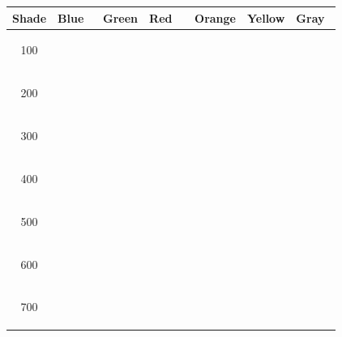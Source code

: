 \FloatBarrier
\begin{table}[ht]
\centering
\begingroup
\setlength{\tabcolsep}{10pt}
\renewcommand{\arraystretch}{1.5}
\begin{tabular}{|c|p{1.5cm}<{\centering}|p{1.5cm}<{\centering}|p{1.5cm}<{\centering}|p{1.5cm}<{\centering}|p{1.5cm}<{\centering}|p{1.5cm}<{\centering}|}
\hline
\textbf{Shade} & \textbf{Blue} & \textbf{Green} & \textbf{Red} & \textbf{Orange} & \textbf{Yellow} & \textbf{Gray} \\ \hline
100 & \colorbox{blue100}{\strut \ \ \ \ \ \ } & \colorbox{green100}{\strut \ \ \ \ \ \ } & \colorbox{red100}{\strut \ \ \ \ \ \ } & \colorbox{orange100}{\strut \ \ \ \ \ \ } & \colorbox{yellow100}{\strut \ \ \ \ \ \ } & \colorbox{gray100}{\strut \ \ \ \ \ \ } \\
200 & \colorbox{blue200}{\strut \ \ \ \ \ \ } & \colorbox{green200}{\strut \ \ \ \ \ \ } & \colorbox{red200}{\strut \ \ \ \ \ \ } & \colorbox{orange200}{\strut \ \ \ \ \ \ } & \colorbox{yellow200}{\strut \ \ \ \ \ \ } & \colorbox{gray200}{\strut \ \ \ \ \ \ } \\
300 & \colorbox{blue300}{\strut \ \ \ \ \ \ } & \colorbox{green300}{\strut \ \ \ \ \ \ } & \colorbox{red300}{\strut \ \ \ \ \ \ } & \colorbox{orange300}{\strut \ \ \ \ \ \ } & \colorbox{yellow300}{\strut \ \ \ \ \ \ } & \colorbox{gray300}{\strut \ \ \ \ \ \ } \\
400 & \colorbox{blue400}{\strut \ \ \ \ \ \ } & \colorbox{green400}{\strut \ \ \ \ \ \ } & \colorbox{red400}{\strut \ \ \ \ \ \ } & \colorbox{orange400}{\strut \ \ \ \ \ \ } & \colorbox{yellow400}{\strut \ \ \ \ \ \ } & \colorbox{gray400}{\strut \ \ \ \ \ \ } \\
500 & \colorbox{blue500}{\strut \ \ \ \ \ \ } & \colorbox{green500}{\strut \ \ \ \ \ \ } & \colorbox{red500}{\strut \ \ \ \ \ \ } & \colorbox{orange500}{\strut \ \ \ \ \ \ } & \colorbox{yellow500}{\strut \ \ \ \ \ \ } & \colorbox{gray500}{\strut \ \ \ \ \ \ } \\
600 & \colorbox{blue600}{\strut \ \ \ \ \ \ } & \colorbox{green600}{\strut \ \ \ \ \ \ } & \colorbox{red600}{\strut \ \ \ \ \ \ } & \colorbox{orange600}{\strut \ \ \ \ \ \ } & \colorbox{yellow600}{\strut \ \ \ \ \ \ } & \colorbox{gray600}{\strut \ \ \ \ \ \ } \\
700 & \colorbox{blue700}{\strut \ \ \ \ \ \ } & \colorbox{green700}{\strut \ \ \ \ \ \ } & \colorbox{red700}{\strut \ \ \ \ \ \ } & \colorbox{orange700}{\strut \ \ \ \ \ \ } & \colorbox{yellow700}{\strut \ \ \ \ \ \ } & \colorbox{gray700}{\strut \ \ \ \ \ \ } \\

\end{tabular}
\end{table}
